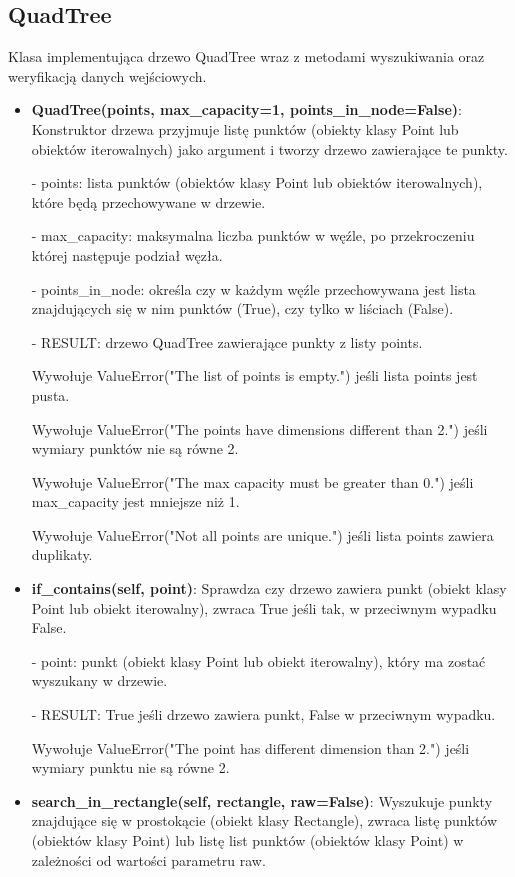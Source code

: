 \documentclass{lab}
\begin{document}
\subsection{QuadTree}
Klasa implementująca drzewo QuadTree wraz z metodami wyszukiwania oraz weryfikacją danych wejściowych.
\begin{itemize}
  \item \textbf{QuadTree(points, max\_capacity=1, points\_in\_node=False)}:
  Konstruktor drzewa przyjmuje listę punktów (obiekty klasy Point lub obiektów iterowalnych) jako argument i tworzy drzewo zawierające te punkty.

  - points: lista punktów (obiektów klasy Point lub obiektów iterowalnych), które będą przechowywane w drzewie.

  - max\_capacity: maksymalna liczba punktów w węźle, po przekroczeniu której następuje podział węzła.

  - points\_in\_node: określa czy w każdym węźle przechowywana jest lista znajdujących się w nim punktów (True), czy tylko w liściach (False).

  - RESULT: drzewo QuadTree zawierające punkty z listy points.

  Wywołuje ValueError("The list of points is empty.") jeśli lista points jest pusta.

  Wywołuje ValueError("The points have dimensions different than 2.") jeśli wymiary punktów nie są równe 2.

  Wywołuje ValueError("The max capacity must be greater than 0.") jeśli max\_capacity jest mniejsze niż 1.

  Wywołuje ValueError("Not all points are unique.") jeśli lista points zawiera duplikaty.

  \item \textbf{if\_contains(self, point)}:
  Sprawdza czy drzewo zawiera punkt (obiekt klasy Point lub obiekt iterowalny), zwraca True jeśli tak, w przeciwnym wypadku False.

  - point: punkt (obiekt klasy Point lub obiekt iterowalny), który ma zostać wyszukany w drzewie.

  - RESULT: True jeśli drzewo zawiera punkt, False w przeciwnym wypadku.

  Wywołuje ValueError("The point has different dimension than 2.") jeśli wymiary punktu nie są równe 2.

  \item \textbf{search\_in\_rectangle(self, rectangle, raw=False)}:
  Wyszukuje punkty znajdujące się w prostokącie (obiekt klasy Rectangle), zwraca listę punktów (obiektów klasy Point) lub listę list punktów (obiektów klasy Point) w zależności od wartości parametru raw.


\end{itemize}
\end{document}
